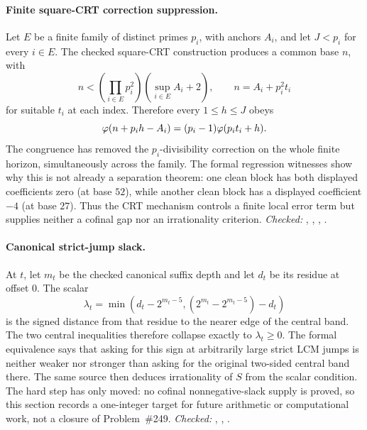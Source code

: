 \documentclass[11pt]{article}
\newcommand{\Stot}{S}
\begin{document}
\paragraph{Finite square-CRT correction suppression.}
Let \(E\) be a finite family of distinct primes \(p_i\), with anchors \(A_i\),
and let \(J<p_i\) for every \(i\in E\).  The checked square-CRT construction
produces a common base \(n\), with
\[
 n<\left(\prod_{i\in E}p_i^2\right)(\sup_{i\in E}A_i+2),
 \qquad n=A_i+p_i^2t_i
\]
for suitable \(t_i\) at each index.  Therefore every \(1\le h\le J\) obeys
\[
 \varphi(n+p_i h-A_i)=(p_i-1)\varphi(p_i t_i+h).
\]
The congruence has removed the \(p_i\)-divisibility correction on the whole
finite horizon, simultaneously across the family.  The formal regression
witnesses show why this is not already a separation theorem: one clean block
has both displayed coefficients zero (at base \(52\)), while another clean
block has a displayed coefficient \(-4\) (at base \(27\)).  Thus the CRT
mechanism controls a finite local error term but supplies neither a cofinal
gap nor an irrationality criterion.
{\footnotesize\emph{Checked:}
,
,
,
.}

\paragraph{Canonical strict-jump slack.}
At $t$, let $m_t$ be the checked canonical suffix depth and let
$d_t$ be its residue at offset $0$.  The scalar
\[
 \lambda_t=\min\!\left(d_t-2^{m_t-5},
       (2^{m_t}-2^{m_t-5})-d_t\right)
\]
is the signed distance from that residue to the nearer edge of the central
band.  The two central inequalities therefore collapse exactly to
$\lambda_t\ge0$.  The formal equivalence says that asking for this
sign at arbitrarily large strict LCM jumps is neither weaker nor stronger
than asking for the original two-sided central band there.  The same source
then deduces irrationality of $\Stot$ from the scalar condition.  The hard
step has only moved: no cofinal nonnegative-slack supply is proved, so this
section records a one-integer target for future arithmetic or computational
work, not a closure of Problem~\#249.
{\footnotesize\emph{Checked:}
,
,
.}
\end{document}
